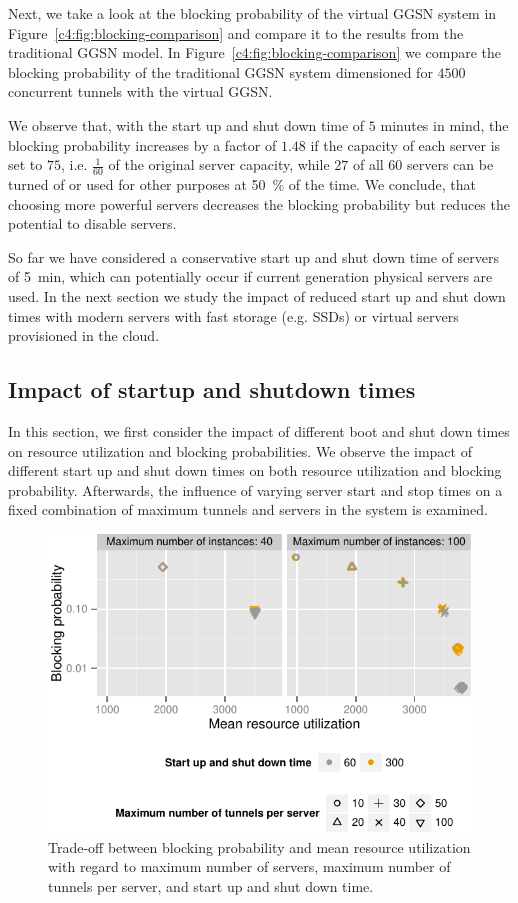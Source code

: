 Next, we take a look at the blocking probability of the virtual \gls{GGSN} system in Figure~\ref{c4:fig:blocking-comparison} and compare it to the results from the traditional \gls{GGSN} model. In Figure~\ref{c4:fig:blocking-comparison} we compare the blocking probability of the traditional \gls{GGSN} system dimensioned for $4500$ concurrent tunnels with the virtual \gls{GGSN}.

We observe that, with the start up and shut down time of $5$ minutes in mind, the blocking probability increases by a factor of $1.48$ if the capacity of each server is set to $75$, i.e. $\frac{1}{60}$ of the original server capacity, while $27$ of all $60$ servers can be turned of or used for other purposes at \SI{50}{\percent} of the time. We conclude, that choosing more powerful servers decreases the blocking probability but reduces the potential to disable servers.

So far we have considered a conservative start up and shut down time of servers of \SI{5}{\minute}, which can potentially occur if current generation physical servers are used.
In the next section we study the impact of reduced start up and shut down times with modern servers with fast storage (e.g. \glspl{SSD}) or virtual servers provisioned in the cloud.


\subsection{Impact of startup and shutdown times}
\label{c4:sec:real_virtual_ggsn}

In this section, we first consider the impact of different boot and shut down times on resource utilization and blocking probabilities. We observe the impact of different start up and shut down times on both resource utilization and blocking probability. Afterwards, the influence of varying server start and stop times on a fixed combination of maximum tunnels and servers in the system is examined.

\begin{figure}[htb]
  \centering
  \includegraphics{images/compare-util-block.pdf}
  \caption{Trade-off between blocking probability and mean resource utilization with regard to maximum number of servers, maximum number of tunnels per server, and start up and shut down time.}
 \label{c4:fig:compare_util_block}
\end{figure}

